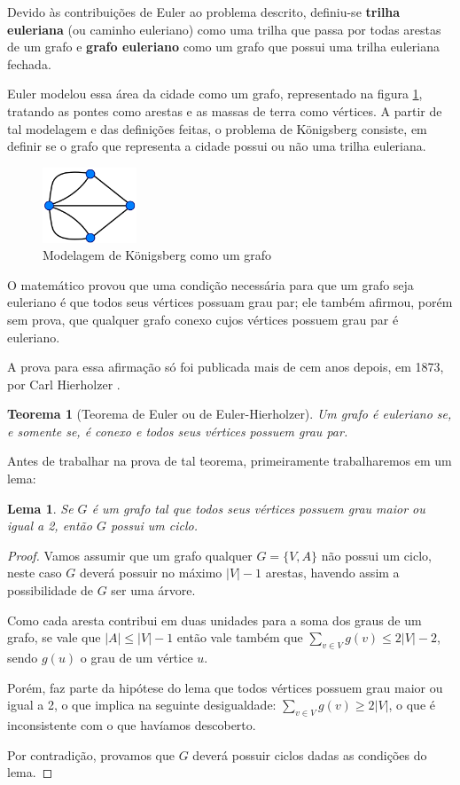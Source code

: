 \documentclass{article}
\newtheorem{theorem}{Teorema}[section]
\newtheorem{lemma}{Lema}
\begin{document}
Devido às contribuições de Euler ao problema descrito, definiu-se \textbf{trilha euleriana} (ou caminho euleriano) como uma trilha que passa por todas arestas de um grafo e \textbf{grafo euleriano} como um grafo que possui uma trilha euleriana fechada.

Euler modelou essa área da cidade como um grafo, representado na figura \ref{konigsberg-graph}, tratando as pontes como arestas e as massas de terra como vértices.
A partir de tal modelagem e das definições feitas, o problema de Königsberg consiste, em definir se o grafo que representa a cidade possui ou não uma trilha euleriana. 


\begin{figure}
    \centering
    \includegraphics[width=0.25\textwidth]{konigsberg-graph.png}
    \caption{Modelagem de Königsberg como um grafo}
    \label{konigsberg-graph}
\end{figure}

O matemático provou que uma condição necessária para que um grafo seja euleriano é que todos seus vértices possuam grau par; 
ele também afirmou, porém sem prova, que qualquer grafo conexo cujos vértices possuem grau par é euleriano.

A prova para essa afirmação só foi publicada mais de cem anos depois, em 1873, por Carl Hierholzer \cite{hierholzer}.

\begin{theorem}[Teorema de Euler ou de Euler-Hierholzer]
    \label{euler}
    Um grafo é euleriano se, e somente se, é conexo e todos seus vértices possuem grau par.
\end{theorem}

Antes de trabalhar na prova de tal teorema, primeiramente trabalharemos em um lema:

\begin{lemma}
	Se $G$ é um grafo tal que todos seus vértices possuem grau maior ou igual a 2, então $G$ possui um ciclo.
\end{lemma}

\begin{proof}
	Vamos assumir que um grafo qualquer $G = \{V, A\}$ não possui um ciclo, neste caso $G$ deverá possuir no máximo $|V| - 1$ arestas, havendo assim a possibilidade de $G$ ser uma árvore. 
	
	Como cada aresta contribui em duas unidades para a soma dos graus de um grafo, se vale que $|A| \leq |V|-1$ então vale também que $\sum_{v \in V} g(v) \leq 2|V| - 2$, sendo $g(u)$ o grau de um vértice $u$. 

	Porém, faz parte da hipótese do lema que todos vértices possuem grau maior ou igual a 2, o que implica na seguinte desigualdade: $\sum_{v \in V}g(v) \geq 2|V|$, o que é inconsistente com o que havíamos descoberto.
	
	Por contradição, provamos que $G$ deverá possuir ciclos dadas as condições do lema.
\end{proof}
\end{document}
